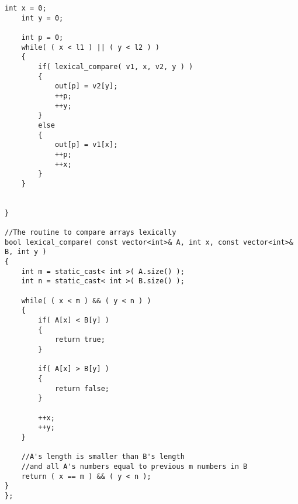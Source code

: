 \begin{lstlisting}[style=customc, caption={Greedy Approach}]
    int x = 0;
    int y = 0;

    int p = 0;
    while( ( x < l1 ) || ( y < l2 ) )
    {
        if( lexical_compare( v1, x, v2, y ) )
        {
            out[p] = v2[y];
            ++p;
            ++y;
        }
        else
        {
            out[p] = v1[x];
            ++p;
            ++x;
        }
    }


}

//The routine to compare arrays lexically
bool lexical_compare( const vector<int>& A, int x, const vector<int>& B, int y )
{
    int m = static_cast< int >( A.size() );
    int n = static_cast< int >( B.size() );

    while( ( x < m ) && ( y < n ) )
    {
        if( A[x] < B[y] )
        {
            return true;
        }

        if( A[x] > B[y] )
        {
            return false;
        }

        ++x;
        ++y;
    }

    //A's length is smaller than B's length
    //and all A's numbers equal to previous m numbers in B
    return ( x == m ) && ( y < n );
}
};
\end{lstlisting}